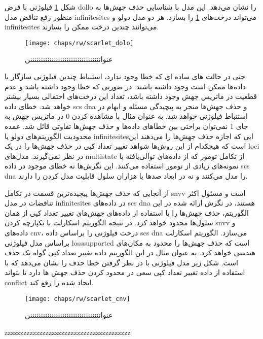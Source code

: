 شکل \ref{fig:ch_rw:scarlet_dolo} فیلوژنی با فرض \gls{dollo} را نشان می‌دهد. این مدل با شناسایی حذف جهش‌ها به منظور رفع تناقض مدل  \gls{infinitesites} می‌تواند درخت‌های \ref{fig:ch_rw:scarlet_dolo} را بسازد. هر دو مدل دولو و \gls{infinitesites} می‌توانند چندین درخت ممکن را بسازند. 
\begin{figure}[!ht]
	\centerline{\texttt{[image: chaps/rw/scarlet\_dolo]}}
	\caption{عنوانننننننننننننننننننننننننننننننننن}
	\label{fig:ch_rw:scarlet_dolo}
\end{figure}
حتی در حالت های ساده ای که خطا وجود ندارد، استنباط چندین فیلوژنی سازگار با داده‌ها ممکن است وجود داشته باشند. در صورتی که خطا وجود داشته باشد و عدم قطعیت در ماتریس جهش وجود داشته باشد، تعداد این درخت‌های احتمالی بسیار بیشتر خواهد شد. خطای داده \gls{scs} \gls{dna} و حذف جهش‌ها منجر به پیچیدگی مسئله و ابهام در استنباط فیلوژنی خواهد شد. به عنوان مثال با مشاهده کردن 0 در ماتریس جهش به جای 1 نمی‌توان براحتی بین خطاهای داده‌ها و حذف جهش‌ها تفاوتی قائل شد. عمده محدودیت الگوریتم‌های دولو یا \gls{infinitesites}ایی که اجازه حذف جهش‌ها را می‌دهند این است که هیچکدام از این روش‌ها شواهد تغییر تعداد کپی در حذف جهش‌ها را در یک  \gls{loci} در نظر نمی‌گیرند. مدل‌های \gls{multistate} از تکامل تومور که از داده‌های توالی‌یافته با نمونه‌های زیادی از تومور استفاده می‌کنند. این نگرش‌ها نه خطای موجود در داده \gls{scs} \gls{dna} را مدل می‌کنند و نه در ابعاد صدها یا هزاران سلول قابلیت مدل کردن را دارند. 

از آنجایی که حذف جهش‌ها پیچیده‌ترین قسمت در تکامل \gls{snvv} است و مسئول اکثر تناقضات در مدل \gls{infinitesites} در داده‌های \gls{scs} \gls{dna} هستند، در نگرش ارائه شده در این الگوریتم، حذف جهش‌ها را با  استفاده از داده‌های جهش‌های تغییر تعداد کپی از همان سلول‌ها محدود خواهد کرد. در نتیجه الگوریتم اسکارلت با یکپارچه کردن \gls{snvv} و داده‌های \gls{cnv}، درخت فیلوژنی را براساس داده \gls{scs} \gls{dna}  می‌سازد. الگوریتم اسکارلت براساس مدل فیلوژنی \gls{losssupported} است که حذف جهش‌ها را محدود به مکان‌های هندسی خواهد کرد. به عنوان مثال در این الگوریتم  داده تغییر تعداد کپی گواه یک حذف است. شکل زیر مدل فیلوژنی با در نظر گرفتن خطا حذف را نشان می‌دهد که با استفاده از داده تغییر تعداد کپی  سعی در محدود کردن حذف جهش ها دارد تا بتواند \gls{conflict} ایجاد شده را رفع کند. 

\begin{figure}[!ht]
	\centerline{\texttt{[image: chaps/rw/scarlet\_cnv]}}
	\caption{عنوانننننننننننننننننننننننننننننننننن}
	\label{fig:ch_rw:scarlet_cnv}
\end{figure}


zzzzzzzzzzzzzzzzzzzzzzzzzzzzzzzzzzzzzzzz

